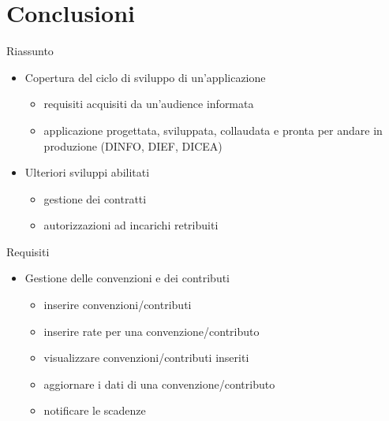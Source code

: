 \section{Conclusioni}
\begin{frame}{Riassunto}
\begin{itemize}
\item Copertura del ciclo di sviluppo di un'applicazione
	\vspace{0.6em}
	\begin{itemize}
	\item requisiti acquisiti da un'audience informata
	\vspace{0.4em}
	\item applicazione progettata, sviluppata, collaudata e\newline
	pronta per andare in produzione (DINFO, DIEF, DICEA)
	\end{itemize}
\vspace{1em}
\item Ulteriori sviluppi abilitati
\vspace{0.6em}
\begin{itemize}
\item gestione dei contratti
\vspace{0.4em}
\item autorizzazioni ad incarichi retribuiti
\end{itemize}
\end{itemize}

\end{frame}
\begin{frame}{Requisiti}
\begin{itemize}
\item Gestione delle convenzioni e dei contributi
\vspace{0.8em}
	\begin{itemize}
	\item inserire convenzioni/contributi
	\item inserire rate per una convenzione/contributo
	\item visualizzare convenzioni/contributi inseriti
	\item aggiornare i dati di una convenzione/contributo
	\item notificare le scadenze
	\end{itemize}
\end{itemize}
\end{frame}


